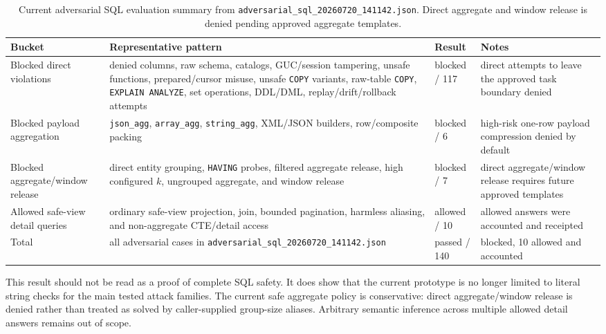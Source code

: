\documentclass[journal]{IEEEtran}
\begin{document}
\begin{table}[!t]
\centering
\scriptsize
\setlength{\tabcolsep}{3pt}
\caption{Current adversarial SQL evaluation summary from
\texttt{adversarial\_sql\_20260720\_141142.json}. Direct aggregate and
window release is denied pending approved aggregate templates.}
\label{tab:adversarial-sql}
\begin{tabular}{@{}
  >{\raggedright\arraybackslash}p{}
  >{\raggedright\arraybackslash}p{}
  >{\raggedright\arraybackslash}p{}
  >{\raggedright\arraybackslash}p{}@{}}
\toprule
Bucket & Representative pattern & Result & Notes \\
\midrule
Blocked direct violations & denied columns, raw schema, catalogs, GUC/session tampering, unsafe functions, prepared/cursor misuse, unsafe \texttt{COPY} variants, raw-table \texttt{COPY}, \texttt{EXPLAIN ANALYZE}, set operations, DDL/DML, replay/drift/rollback attempts & 117 blocked / 117 & direct attempts to leave the approved task boundary denied \\
Blocked payload aggregation & \texttt{json\_agg}, \texttt{array\_agg}, \texttt{string\_agg}, XML/JSON builders, row/composite packing & 6 blocked / 6 & high-risk one-row payload compression denied by default \\
Blocked aggregate/window release & direct entity grouping, \texttt{HAVING} probes, filtered aggregate release, high configured \(k\), ungrouped aggregate, and window release & 7 blocked / 7 & direct aggregate/window release requires future approved templates \\
Allowed safe-view detail queries & ordinary safe-view projection, join, bounded pagination, harmless aliasing, and non-aggregate CTE/detail access & 10 allowed / 10 & allowed answers were accounted and receipted \\
Total & all adversarial cases in \texttt{adversarial\_sql\_20260720\_141142.json} & 140 passed / 140 & 130 blocked, 10 allowed and accounted \\
\bottomrule
\end{tabular}
\end{table}

This result should not be read as a proof of complete SQL safety. It
does show that the current prototype is no longer limited to literal string
checks for the main tested attack families. The current safe aggregate
policy is conservative: direct aggregate/window release is denied rather
than treated as solved by caller-supplied group-size aliases. Arbitrary
semantic inference across multiple allowed detail answers remains out of
scope.
\end{document}
